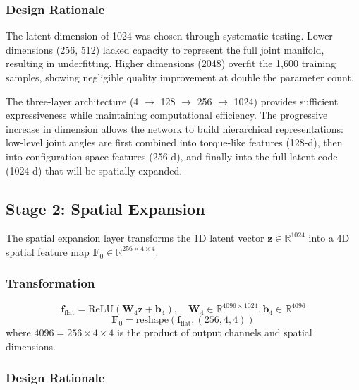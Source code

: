 \documentclass[12pt,a4paper,oneside]{report}
\begin{document}
\subsubsection{Design Rationale}

The latent dimension of 1024 was chosen through systematic testing. Lower dimensions (256, 512) lacked capacity to represent the full joint manifold, resulting in underfitting. Higher dimensions (2048) overfit the 1,600 training samples, showing negligible quality improvement at double the parameter count.

The three-layer architecture (4 $\rightarrow$ 128 $\rightarrow$ 256 $\rightarrow$ 1024) provides sufficient expressiveness while maintaining computational efficiency. The progressive increase in dimension allows the network to build hierarchical representations: low-level joint angles are first combined into torque-like features (128-d), then into configuration-space features (256-d), and finally into the full latent code (1024-d) that will be spatially expanded.

\subsection{Stage 2: Spatial Expansion}

The spatial expansion layer transforms the 1D latent vector $\mathbf{z} \in \mathbb{R}^{1024}$ into a 4D spatial feature map $\mathbf{F}_0 \in \mathbb{R}^{256 \times 4 \times 4}$.

\subsubsection{Transformation}

\begin{equation}
\mathbf{f}_{\text{flat}} = \text{ReLU}(\mathbf{W}_4 \mathbf{z} + \mathbf{b}_4), \quad \mathbf{W}_4 \in \mathbb{R}^{4096 \times 1024}, \mathbf{b}_4 \in \mathbb{R}^{4096}
\end{equation}
\begin{equation}
\mathbf{F}_0 = \text{reshape}(\mathbf{f}_{\text{flat}}, (256, 4, 4))
\end{equation}
where $4096 = 256 \times 4 \times 4$ is the product of output channels and spatial dimensions.

\subsubsection{Design Rationale}
\end{document}

